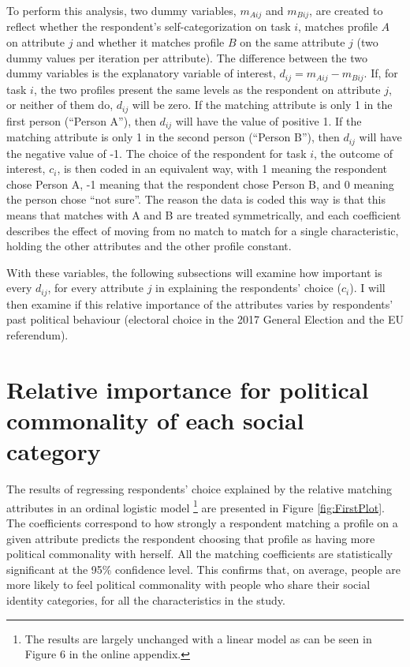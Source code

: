\documentclass[a4paper]{cupjournal}
\begin{document}
To perform this analysis, two dummy variables, \(m_{Aij}\) and \(m_{Bij}\), are created to reflect whether the respondent's self-categorization on task \(i\), matches profile \(A\) on attribute \(j\) and whether it matches profile \(B\) on the same attribute \(j\) (two dummy values per iteration per attribute). The difference between the two dummy variables is the explanatory variable of interest, \(d_{ij} = m_{Aij}-m_{Bij}\). If, for task \(i\), the two profiles present the same levels as the respondent on attribute \(j\), or neither of them do, \(d_{ij}\) will be zero. If the matching attribute is only 1 in the first person (``Person A''), then \(d_{ij}\) will have the value of positive 1. If the matching attribute is only 1 in the second person (``Person B''), then \(d_{ij}\) will have the negative value of -1. The choice of the respondent for task \(i\), the outcome of interest, \(c_i\), is then coded in an equivalent way, with 1 meaning the respondent chose Person A, -1 meaning that the respondent chose Person B, and 0 meaning the person chose ``not sure''. The reason the data is coded this way is that this means that matches with A and B are treated symmetrically, and each coefficient describes the effect of moving from no match to match for a single characteristic, holding the other attributes and the other profile constant.

With these variables, the following subsections will examine how important is every \(d_{ij}\), for every attribute \(j\) in explaining the respondents' choice (\(c_i\)). I will then examine if this relative importance of the attributes varies by respondents' past political behaviour (electoral choice in the 2017 General Election and the EU referendum).

\newpage

\hypertarget{relative-importance-for-political-commonality-of-each-social-category}{%
\section{Relative importance for political commonality of each social category}\label{relative-importance-for-political-commonality-of-each-social-category}}

The results of regressing respondents' choice explained by the relative matching attributes in an ordinal logistic model \footnote{The results are largely unchanged with a linear model as can be seen in Figure 6 in the online appendix.} are presented in Figure \ref{fig:FirstPlot}. The coefficients correspond to how strongly a respondent matching a profile on a given attribute predicts the respondent choosing that profile as having more political commonality with herself.
All the matching coefficients are statistically significant at the 95\% confidence level. This confirms that, on average, people are more likely to feel political commonality with people who share their social identity categories, for all the characteristics in the study.
\end{document}
